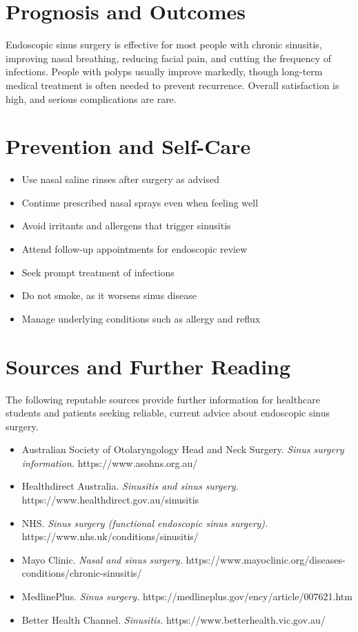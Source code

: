 \section*{Prognosis and Outcomes}
Endoscopic sinus surgery is effective for most people with chronic sinusitis, improving nasal breathing, reducing facial pain, and cutting the frequency of infections. People with polyps usually improve markedly, though long-term medical treatment is often needed to prevent recurrence. Overall satisfaction is high, and serious complications are rare.

\section*{Prevention and Self-Care}
\begin{itemize}
    \item Use nasal saline rinses after surgery as advised
    \item Continue prescribed nasal sprays even when feeling well
    \item Avoid irritants and allergens that trigger sinusitis
    \item Attend follow-up appointments for endoscopic review
    \item Seek prompt treatment of infections
    \item Do not smoke, as it worsens sinus disease
    \item Manage underlying conditions such as allergy and reflux
\end{itemize}

\section*{Sources and Further Reading}
The following reputable sources provide further information for healthcare students and patients seeking reliable, current advice about endoscopic sinus surgery.
\begin{itemize}
    \item Australian Society of Otolaryngology Head and Neck Surgery. \textit{Sinus surgery information.} https://www.asohns.org.au/
    \item Healthdirect Australia. \textit{Sinusitis and sinus surgery.} https://www.healthdirect.gov.au/sinusitis
    \item NHS. \textit{Sinus surgery (functional endoscopic sinus surgery).} https://www.nhs.uk/conditions/sinusitis/
    \item Mayo Clinic. \textit{Nasal and sinus surgery.} https://www.mayoclinic.org/diseases-conditions/chronic-sinusitis/
    \item MedlinePlus. \textit{Sinus surgery.} https://medlineplus.gov/ency/article/007621.htm
    \item Better Health Channel. \textit{Sinusitis.} https://www.betterhealth.vic.gov.au/
\end{itemize}
